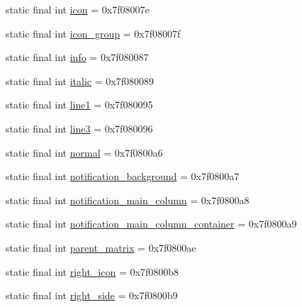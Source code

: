 \begin{DoxyCompactItemize}
\item 
static final int \mbox{\hyperlink{classandroid_1_1support_1_1transition_1_1_r_1_1id_aa2f972494c0d7b910dd334c97f0772e6}{icon}} = 0x7f08007e
\item 
static final int \mbox{\hyperlink{classandroid_1_1support_1_1transition_1_1_r_1_1id_a08ac623c6ab50ea0df40c5238d71d1c4}{icon\+\_\+group}} = 0x7f08007f
\item 
static final int \mbox{\hyperlink{classandroid_1_1support_1_1transition_1_1_r_1_1id_ae08413c0d77b9044bbe26ee181089869}{info}} = 0x7f080087
\item 
static final int \mbox{\hyperlink{classandroid_1_1support_1_1transition_1_1_r_1_1id_a7213dcb4b1139d5bf1ce002b876e5de1}{italic}} = 0x7f080089
\item 
static final int \mbox{\hyperlink{classandroid_1_1support_1_1transition_1_1_r_1_1id_a2ab7b382860fb7936200212780d2132a}{line1}} = 0x7f080095
\item 
static final int \mbox{\hyperlink{classandroid_1_1support_1_1transition_1_1_r_1_1id_a80854f8678321c5cb7a484e765f9dc81}{line3}} = 0x7f080096
\item 
static final int \mbox{\hyperlink{classandroid_1_1support_1_1transition_1_1_r_1_1id_a1c89776c0d58c58e156d6de957fb1ea2}{normal}} = 0x7f0800a6
\item 
static final int \mbox{\hyperlink{classandroid_1_1support_1_1transition_1_1_r_1_1id_a3dc75722edc5e00de09783de28d80caf}{notification\+\_\+background}} = 0x7f0800a7
\item 
static final int \mbox{\hyperlink{classandroid_1_1support_1_1transition_1_1_r_1_1id_a381db437d0b325d78a0ff8c46dc77ff1}{notification\+\_\+main\+\_\+column}} = 0x7f0800a8
\item 
static final int \mbox{\hyperlink{classandroid_1_1support_1_1transition_1_1_r_1_1id_ae81ddff59aa2cc6a5d146fa6fd8e9969}{notification\+\_\+main\+\_\+column\+\_\+container}} = 0x7f0800a9
\item 
static final int \mbox{\hyperlink{classandroid_1_1support_1_1transition_1_1_r_1_1id_acab020b8ca2cbd92c45c2229e7b00179}{parent\+\_\+matrix}} = 0x7f0800ae
\item 
static final int \mbox{\hyperlink{classandroid_1_1support_1_1transition_1_1_r_1_1id_a9755609f3032042fe7e83172281f4006}{right\+\_\+icon}} = 0x7f0800b8
\item 
static final int \mbox{\hyperlink{classandroid_1_1support_1_1transition_1_1_r_1_1id_a96d440979b8fc848595de58aee89e4a4}{right\+\_\+side}} = 0x7f0800b9
\item 

\end{DoxyCompactItemize}
